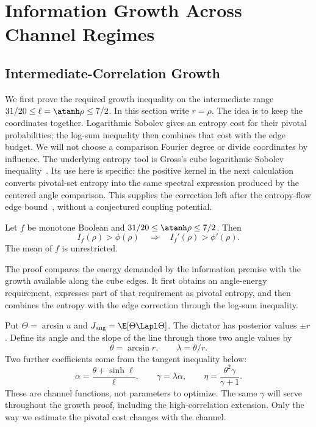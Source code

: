\section{Information Growth Across Channel Regimes}
\label{sec:pivotal-middle}

\subsection{Intermediate-Correlation Growth}

We first prove the required growth inequality on the intermediate range
\(31/20\le\ell=\atanh\rho\le7/2\). In this section write \(r=\rho\).
The idea is to keep the coordinates together. Logarithmic Sobolev gives
an entropy cost for their pivotal probabilities; the log-sum inequality
then combines that cost with the edge budget. We will not choose a
comparison Fourier degree or divide coordinates by influence.
The underlying entropy tool is Gross's cube logarithmic Sobolev
inequality~\cite{Gross,ODonnell}. Its use here is specific: the positive
kernel in the next calculation converts pivotal-set entropy into the
same spectral expression produced by the centered angle comparison.
This supplies the correction left after the entropy-flow edge
bound~\cite{CGN}, without a conjectured coupling potential.


\begin{proposition}
\label{prop:middle-growth}
Let \(f\) be monotone Boolean and
\(31/20\le\atanh\rho\le7/2\). Then
\[
 I_f(\rho)>\phi(\rho)\quad\Longrightarrow\quad
 I_f'(\rho)>\phi'(\rho).
\]
The mean of \(f\) is unrestricted.
\end{proposition}

The proof compares the energy demanded by the information premise with
the growth available along the cube edges. It first obtains an
angle-energy requirement, expresses part of that requirement as pivotal
entropy, and then combines the entropy with the edge correction through
the log-sum inequality.

Put \(\Theta=\arcsin u\) and \(J_{\rm ang}=\E[\Theta\Lapl\Theta]\).
The dictator has posterior values \(\pm r\). Define its angle and the
slope of the line through those two angle values by
\[
 \theta=\arcsin r,\qquad \lambda=\theta/r.
\]
Two further coefficients come from the tangent inequality below:
\[
 \alpha=\frac{\theta+\sinh\ell}{\ell},\qquad
 \gamma=\lambda\alpha,\qquad
 \eta=\frac{\theta^2\gamma}{\gamma+1}.
\]
These are channel functions, not parameters to optimize.
The same \(\gamma\) will serve throughout the growth proof, including
the high-correlation extension. Only the way we estimate the pivotal
cost changes with the channel.

